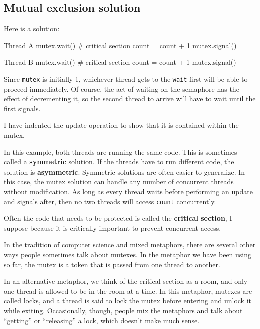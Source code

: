 \subsection*{Mutual exclusion solution}

Here is a solution:

\begin{lsthalfbox}[before skip=0.6em]{Thread A}
mutex.wait()
    # critical section
    count = count + 1
mutex.signal()
\end{lsthalfbox}
\begin{lsthalfbox}[after skip=0.6em]{Thread B}
mutex.wait()
    # critical section
    count = count + 1
mutex.signal()
\end{lsthalfbox}

Since {\tt mutex} is initially 1, whichever thread gets to
the {\tt wait} first will be able to proceed immediately.
Of course, the act of waiting on the semaphore has the effect
of decrementing it, so the second thread to
arrive will have to wait until the first signals.

I have indented the update operation to show that it is contained
within the mutex.

In this example, both threads are running the same code.  This is
sometimes called a {\bf symmetric} solution.  If the threads have to
run different code, the solution is {\bf asymmetric}.  Symmetric
solutions are often easier to generalize.  In this case, the mutex
solution can handle any number of concurrent threads without
modification.  As long as every thread waits before 
performing an update and signals after, then no two threads
will access {\tt count} concurrently.

Often the code that needs to be protected is called the
{\bf critical section}, I suppose because it is critically
important to prevent concurrent access.

In the tradition of computer science and mixed metaphors, there
are several other ways people sometimes talk about mutexes.  In
the metaphor we have been using so far, the mutex is a token
that is passed from one thread to another.

In an alternative
metaphor, we think of the critical section as a room, and
only one thread is allowed to be in the room at a time.
In this metaphor, mutexes are called locks, and a thread
is said to lock the mutex before entering and unlock it while
exiting.  Occasionally, though, people mix the metaphors and
talk about ``getting'' or ``releasing'' a lock, which doesn't
make much sense.

